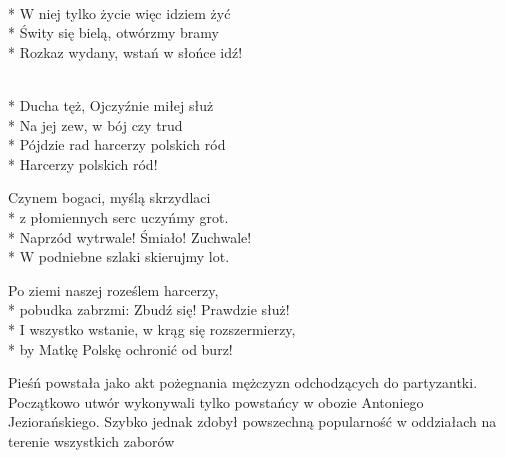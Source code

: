 
\begin{lyrics}[longestline={I wszystko wstanie, w krąg się rozszermierzy,}]

\\*
W niej tylko życie więc idziem żyć\\*
Świty się bielą, otwórzmy bramy\\*
Rozkaz wydany, wstań w słońce idź!

\begin{chorus}
\\*
Ducha tęż, Ojczyźnie miłej służ\\*
Na jej zew, w bój czy trud\\*
Pójdzie rad harcerzy polskich ród\\*
Harcerzy polskich ród!
\end{chorus}

Czynem bogaci, myślą skrzydlaci\\*
z płomiennych serc uczyńmy grot.\\*
Naprzód wytrwale! Śmiało! Zuchwale!\\*
W podniebne szlaki skierujmy lot.

\chorusref

Po ziemi naszej roześlem harcerzy,\\*
pobudka zabrzmi: Zbudź się! Prawdzie służ!\\*
I wszystko wstanie, w krąg się rozszermierzy,\\*
by Matkę Polskę ochronić od burz!

\chorusref
\end{lyrics}



\begin{info}Pieśń powstała jako akt pożegnania mężczyzn odchodzących do partyzantki. Początkowo utwór wykonywali tylko powstańcy w obozie Antoniego Jeziorańskiego. Szybko jednak zdobył powszechną popularność w oddziałach na terenie wszystkich zaborów\end{info}

